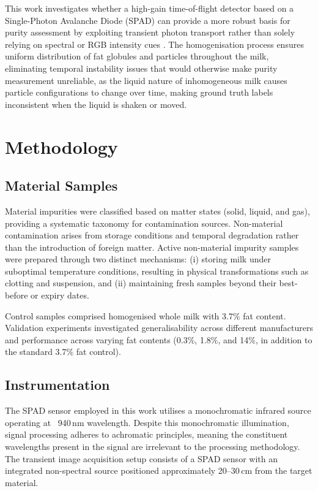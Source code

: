 \documentclass[11pt]{article}
\begin{document}
This work investigates whether a high-gain time-of-flight detector based on a Single-Photon Avalanche Diode (SPAD) can provide a more robust basis for purity assessment by exploiting transient photon transport rather than solely relying on spectral or RGB intensity cues \cite{nielsen2013,gyongy2021}. The homogenisation process ensures uniform distribution of fat globules and particles throughout the milk, eliminating temporal instability issues that would otherwise make purity measurement unreliable, as the liquid nature of inhomogeneous milk causes particle configurations to change over time, making ground truth labels inconsistent when the liquid is shaken or moved.

\section{Methodology}

\subsection{Material Samples}

Material impurities were classified based on matter states (solid, liquid, and gas), providing a systematic taxonomy for contamination sources. Non-material contamination arises from storage conditions and temporal degradation rather than the introduction of foreign matter. Active non-material impurity samples were prepared through two distinct mechanisms: (i) storing milk under suboptimal temperature conditions, resulting in physical transformations such as clotting and suspension, and (ii) maintaining fresh samples beyond their best-before or expiry dates.

Control samples comprised homogenised whole milk with 3.7\% fat content. Validation experiments investigated generalisability across different manufacturers and performance across varying fat contents (0.3\%, 1.8\%, and 14\%, in addition to the standard 3.7\% fat control).

\subsection{Instrumentation}

The SPAD sensor employed in this work utilises a monochromatic infrared source operating at ~940\,nm wavelength. Despite this monochromatic illumination, signal processing adheres to achromatic principles, meaning the constituent wavelengths present in the signal are irrelevant to the processing methodology. The transient image acquisition setup consists of a SPAD sensor with an integrated non-spectral source positioned approximately 20--30\,cm from the target material.
\end{document}
